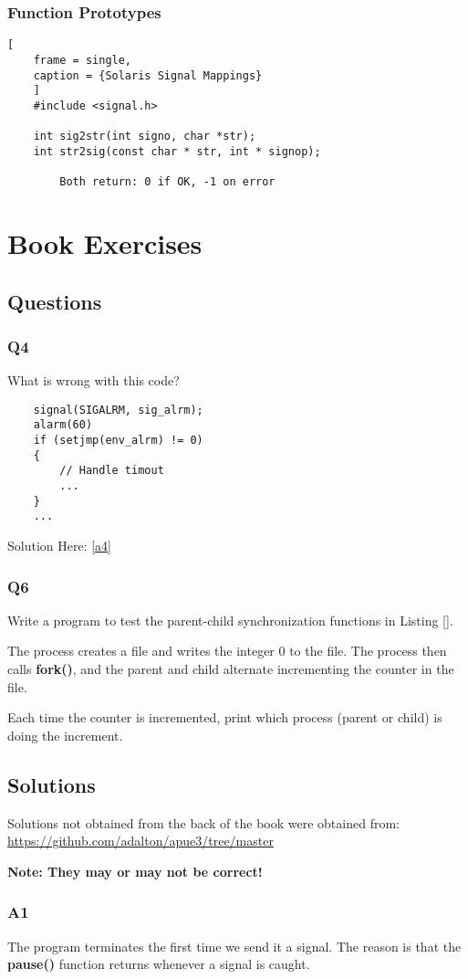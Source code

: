 \documentclass{article}
\begin{document}
\subsubsection{Function Prototypes}
\begin{lstlisting}[
    frame = single,
    caption = {Solaris Signal Mappings}
    ]
    #include <signal.h>

    int sig2str(int signo, char *str);
    int str2sig(const char * str, int * signop);

        Both return: 0 if OK, -1 on error
\end{lstlisting}
\section{Book Exercises}
\subsection{Questions}
\subsubsection{Q4}
What is wrong with this code?
\begin{lstlisting}
    signal(SIGALRM, sig_alrm);
    alarm(60)
    if (setjmp(env_alrm) != 0)
    {
        // Handle timout
        ...
    }
    ...
\end{lstlisting}
    Solution Here: \ref{a4}
\subsubsection{Q6}
Write a program to test the parent-child synchronization functions in Listing [].

The process creates a file and writes the integer 0 to the file. The process 
then calls \textbf{fork()}, and the parent and child alternate incrementing the counter in the file. 

Each time the counter is incremented, print which process (parent or child) is doing the increment.

\subsection{Solutions}
Solutions not obtained from the back of the book were obtained from: \newline
\url{https://github.com/adalton/apue3/tree/master}

\textbf{Note: They may or may not be correct!}
\subsubsection{A1}
\label{a1}
The program terminates the first time we send it a signal. The reason is that the \textbf{pause()} function returns whenever a signal is caught.
\end{document}
